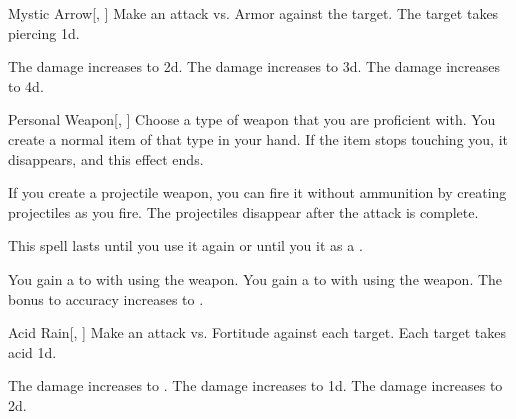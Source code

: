 \lowercase{\hypertarget{spell:Mystic Arrow}{}}\label{spell:Mystic Arrow}
\begin{freeability}[Rank 1]{\hypertarget{spell:Mystic Arrow}{Mystic Arrow}}[, ]
Make an attack vs. Armor against the target.
\hit The target takes piercing  \plus1d.

\rankline
{} The damage increases to  \plus2d.
 The damage increases to  \plus3d.
 The damage increases to  \plus4d.

\end{freeability}
\vspace{0.25em}



\lowercase{\hypertarget{spell:Personal Weapon}{}}\label{spell:Personal Weapon}
\begin{freeability}[Rank 1]{\hypertarget{spell:Personal Weapon}{Personal Weapon}}[, ]
Choose a type of weapon that you are proficient with.
You create a normal item of that type in your hand.
If the item stops touching you, it disappears, and this effect ends.

If you create a projectile weapon, you can fire it without ammunition by creating projectiles as you fire.
The projectiles disappear after the attack is complete.

This spell lasts until you use it again or until you  it as a .

\rankline
{} You gain a   to  with  using the weapon.
 You gain a   to  with  using the weapon.
 The bonus to accuracy increases to .

\end{freeability}
\vspace{0.25em}



\lowercase{\hypertarget{spell:Acid Rain}{}}\label{spell:Acid Rain}
\begin{freeability}[Rank 2]{\hypertarget{spell:Acid Rain}{Acid Rain}}[, ]
Make an attack vs. Fortitude against each target.
\hit Each target takes acid  \minus1d.

\rankline
{} The damage increases to .
 The damage increases to  \plus1d.
 The damage increases to  \plus2d.

\end{freeability}
\vspace{0.25em}



